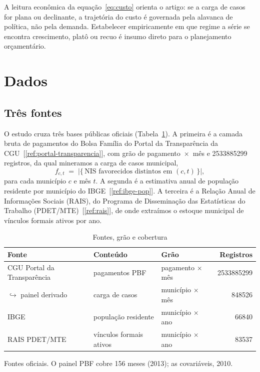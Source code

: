 \documentclass[12pt,a4paper,oneside]{article}
\newcommand{\C}[1]{[\ref{#1}]}
\begin{document}
A leitura econômica da equação~\eqref{eq:custo} orienta o artigo: se a
carga de casos for plana ou declinante, a trajetória do custo é governada
pela alavanca de política, não pela demanda. Estabelecer empiricamente em
que regime a série se encontra \textemdash{} crescimento, platô ou recuo
\textemdash{} é insumo direto para o planejamento orçamentário.

\section{Dados}
\label{sec:dados}

\subsection{Três fontes}

O estudo cruza três bases públicas oficiais (Tabela~\ref{tab:dados}). A
primeira é a camada bruta de pagamentos do Bolsa Família do Portal da
Transparência da CGU~\C{ref:portal-transparencia}, com grão de
pagamento~$\times$~mês e \num{2533885299} registros, da qual mineramos a
carga de casos municipal,
\begin{equation}
f_{c,t} \;=\; \bigl|\{\,\text{NIS favorecidos distintos em } (c,t)\,\}\bigr|,
\end{equation}
para cada município $c$ e mês $t$. A segunda é a estimativa anual de
população residente por município do IBGE~\C{ref:ibge-pop}. A terceira é a
Relação Anual de Informações Sociais (RAIS), do Programa de Disseminação
das Estatísticas do Trabalho (PDET/MTE)~\C{ref:rais}, de onde extraímos o
estoque municipal de vínculos formais ativos por ano.

\begin{table}[H]
\centering
\caption{Fontes, grão e cobertura}
\label{tab:dados}
\small
\begin{tabular}{@{}lllr@{}}
\toprule
\textbf{Fonte} & \textbf{Conteúdo} & \textbf{Grão} & \textbf{Registros} \\
\midrule
CGU \textendash{} Portal da Transparência & pagamentos PBF & pagamento $\times$ mês & \num{2533885299} \\
\quad$\hookrightarrow$ painel derivado     & carga de casos & município $\times$ mês & \num{848526} \\
IBGE                                       & população residente & município $\times$ ano & \num{66840} \\
RAIS \textendash{} PDET/MTE                 & vínculos formais ativos & município $\times$ ano & \num{83537} \\
\bottomrule
\end{tabular}
\par\smallskip
{\footnotesize Fontes oficiais. O painel PBF cobre 156 meses
(2013); as covariáveis, 2010.}
\end{table}
\end{document}
